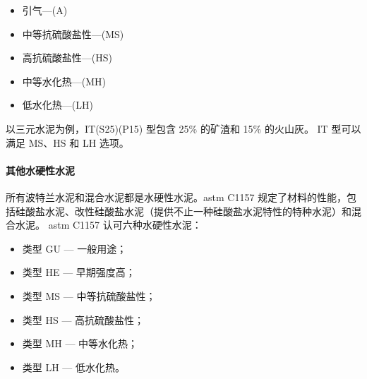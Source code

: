 \begin{itemize}
  \item 引气—(A)
  \item 中等抗硫酸盐性—(MS)
  \item 高抗硫酸盐性—(HS)
  \item 中等水化热—(MH)
  \item 低水化热—(LH)
\end{itemize}

以三元水泥为例，IT(S25)(P15) 型包含 25\% 的矿渣和 15\% 的火山灰。 IT 型可以满足 MS、HS 和 LH 选项。

\paragraph{其他水硬性水泥}
所有波特兰水泥和混合水泥都是水硬性水泥。\acrshort*{astm} C1157 规定了材料的性能，包括硅酸盐水泥、改性硅酸盐水泥（提供不止一种硅酸盐水泥特性的特种水泥）和混合水泥。 \acrshort*{astm} C1157 认可六种水硬性水泥：
\begin{itemize}
  \item 类型 GU — 一般用途；
  \item 类型 HE — 早期强度高；
  \item 类型 MS — 中等抗硫酸盐性；
  \item 类型 HS — 高抗硫酸盐性；
  \item 类型 MH — 中等水化热；
  \item 类型 LH — 低水化热。
\end{itemize}

